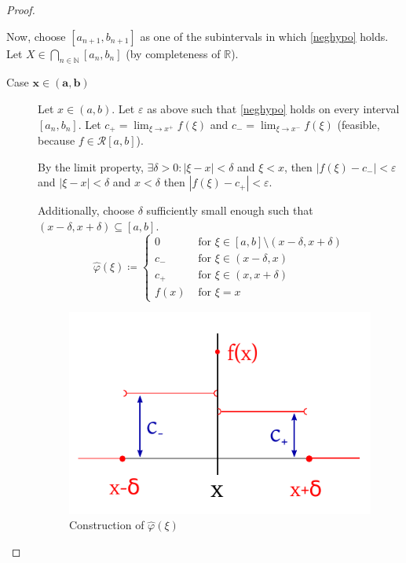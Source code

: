 \documentclass{article}
\newcommand{\card}[1]{\left|#1\right|}
\begin{document}
\begin{proof}
\begin{description}
      Now, choose $[a_{n+1}, b_{n+1}]$ as one of the subintervals in which \eqref{neghypo} holds.
      Let $X \in \bigcap_{n \in \mathbb N} [a_n, b_n]$ (by completeness of $\mathbb R$).

      \begin{description}
        \item[Case $\mathbf{x \in (a,b)}$] 
          Let $x \in (a, b)$. Let $\varepsilon$ as above such that \eqref{neghypo} holds on every interval $[a_n, b_n]$.
          Let $c_+ = \lim_{\xi \to x^+} f(\xi)$ and $c_- = \lim_{\xi \to x^-} f(\xi)$ (feasible, because $f \in \mathcal R[a,b]$).

          By the limit property, $\exists \delta > 0: \card{\xi - x} < \delta$ and $\xi < x$, then $\card{f(\xi) - c_-} < \varepsilon$
          and $\card{\xi - x} < \delta$ and $x < \delta$ then $\card{f(\xi) - c_+} < \varepsilon$.

          Additionally, choose $\delta$ sufficiently small enough such that $(x - \delta, x + \delta) \subseteq [a, b]$.
          \[
            \hat\varphi(\xi) \coloneqq \begin{cases}
              0 & \text{ for } \xi \in [a,b] \setminus (x - \delta, x + \delta) \\
              c_- & \text{ for } \xi \in (x - \delta, x) \\
              c_+ & \text{ for } \xi \in (x, x + \delta) \\
              f(x) & \text{ for } \xi = x
            \end{cases}
          \]

          \begin{figure}[t]
            \begin{center}
              \includegraphics{img/16_construction.pdf}
              \caption{Construction of $\hat\varphi(\xi)$}
              \label{img:hatvarphi}
            \end{center}
          \end{figure}


\end{description}
\end{description}
\end{proof}
\end{document}
